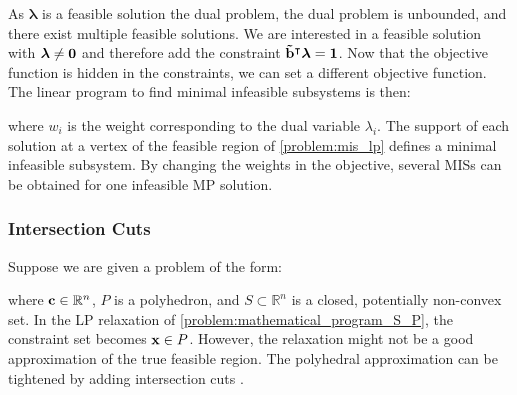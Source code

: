 As $\boldsymbol \lambda$ is a feasible solution the dual problem, the dual problem is unbounded, and there exist multiple feasible solutions. We are interested in a feasible solution with $\boldsymbol \lambda \neq \bold 0$ and therefore add the constraint $\bold{\tilde b}^\intercal \boldsymbol \lambda = \bold 1$. Now that the objective function is hidden in the constraints, we can set a different objective function.
The linear program to find minimal infeasible subsystems is then:
\quad where $w_i$ is the weight corresponding to the dual variable $\lambda_i$. The support of each solution at a vertex of the feasible region of \cref{problem:mis_lp}  defines a minimal infeasible subsystem. By changing the weights in the objective, several MISs can be obtained for one infeasible MP solution. 


\subsubsection{Intersection Cuts} \label{section:optimization_intersection_cuts}

Suppose we are given a problem of the form:
\quad where $\bold c \in \mathbb{R}^n$, $P$ is a polyhedron, and $S \subset \mathbb{R}^n$ is a closed, potentially non-convex set.
In the LP relaxation of \cref{problem:mathematical_program_S_P}, the constraint set becomes $\bold x \in P$. However, the relaxation might not be a good approximation of the true feasible region. The polyhedral approximation 
can be tightened by adding intersection cuts \cite{bienstock_outer_product_free_sets}. 


